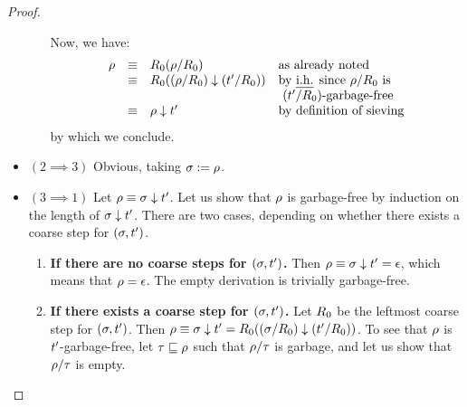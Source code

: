 \begin{proof}
\begin{itemize}
\begin{enumerate}
    Now, we have:
    \[
      \begin{array}{rcll}
        \redseq & \permeq & \redex_0(\redseq/\redex_0)                          & \text{as already noted} \\
                & \permeq & \redex_0((\redseq/\redex_0) \sieve (\tm'/\redex_0)) & \text{by \ih since $\redseq/\redex_0$ is} \\
                                                                              &&& \text{ $(\tm'/\redex_0)$-garbage-free} \\
                & \permeq & \redseq \sieve \tm'                                 & \text{by definition of sieving} \\
      \end{array}
    \]
    by which we conclude.
  \end{enumerate}
\item $(2 \implies 3)$ Obvious, taking $\sigma := \rho$.
\item $(3 \implies 1)$
  Let $\rho \equiv \sigma \downarrow t'$.
  Let us show that $\rho$ is garbage-free by induction on the length of $\sigma \downarrow t'$.
  There are two cases, depending on whether there exists a coarse step for $(\sigma,t')$.
  \begin{enumerate}
  \item {\bf If there are no coarse steps for $(\sigma,t')$.}
    Then $\rho \equiv \sigma \downarrow t' = \epsilon$, which means that $\rho = \epsilon$.
    The empty derivation is trivially garbage-free.
  \item {\bf If there exists a coarse step for $(\sigma,t')$.}
    Let $R_0$ be the leftmost coarse step for $(\sigma,t')$.
    Then $\rho \equiv \sigma \downarrow t' = R_0((\sigma/R_0) \downarrow (t'/R_0))$.
    To see that $\rho$ is $t'$-garbage-free,
    let $\tau \sqsubseteq \rho$ such that $\rho/\tau$ is garbage,
    and let us show that $\rho/\tau$ is empty. 


\end{enumerate}
\end{itemize}
\end{proof}
